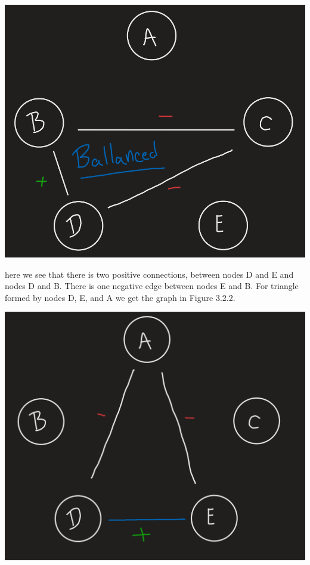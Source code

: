 \documentclass[11pt]{article}
\begin{document}
\begin{enumerate}
{\begin{center}
	\includegraphics[scale=0.5]{Figure_3_2_1}\\
\end{center}
here we see that there is two positive connections, between nodes D and E and nodes D and B.  There is one negative edge between nodes E and B. For triangle formed by nodes D, E, and A we get the graph in Figure 3.2.2.
\begin{center}
	\includegraphics[scale=0.5]{Figure_3_2_2}\\

\end{center}}
\end{enumerate}
\end{document}
